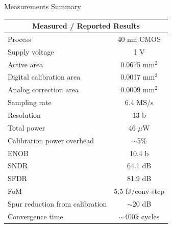 \documentclass[aspectratio=169]{beamer}
\begin{document}
\begin{frame}{Measurements Summary}
  \centering
  \small
  \begin{tabular}{|l|c|}
    \hline
    \multicolumn{2}{|c|}{\textbf{Measured / Reported Results}} \\
    \hline
    Process & 40 nm CMOS \\
    \hline
    Supply voltage & 1 V \\
    \hline
    Active area & 0.0675 mm$^2$ \\
    \hline
    Digital calibration area & 0.0017 mm$^2$ \\
    \hline
    Analog correction area & 0.0009 mm$^2$ \\
    \hline
    Sampling rate & 6.4 MS/s \\
    \hline
    Resolution & 13 b \\
    \hline
    Total power & 46 $\mu$W \\
    \hline
    Calibration power overhead & $\sim$5\% \\
    \hline
    ENOB & 10.4 b \\
    \hline
    SNDR & 64.1 dB \\
    \hline
    SFDR & 81.9 dB \\
    \hline
    FoM & 5.5 fJ/conv-step \\
    \hline
    Spur reduction from calibration & $\sim$20 dB \\
    \hline
    Convergence time & $\sim$400k cycles \\
    \hline
  \end{tabular}
\end{frame}
\end{document}

